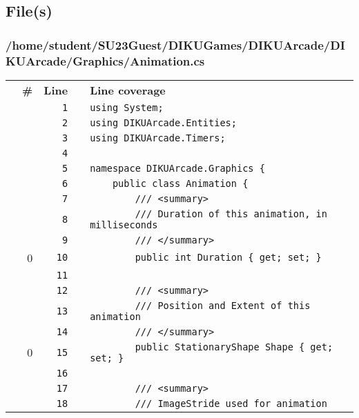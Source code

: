 \documentclass[a4paper,landscape,10pt]{article}
\begin{document}
\subsection{File(s)}
\subsubsection{/home/student/SU23Guest/DIKUGames/DIKUArcade/DIKUArcade/Graphics/Animation.cs}
\begin{longtable}[l]{lrrll}
\textbf{} & \textbf{\#} & \textbf{Line} & \textbf{} & \textbf{Line coverage}\\
\cellcolor{gray} &  & \verb~1~ & & \verb~using System;~\\
\cellcolor{gray} &  & \verb~2~ & & \verb~using DIKUArcade.Entities;~\\
\cellcolor{gray} &  & \verb~3~ & & \verb~using DIKUArcade.Timers;~\\
\cellcolor{gray} &  & \verb~4~ & & \verb~~\\
\cellcolor{gray} &  & \verb~5~ & & \verb~namespace DIKUArcade.Graphics {~\\
\cellcolor{gray} &  & \verb~6~ & & \verb~    public class Animation {~\\
\cellcolor{gray} &  & \verb~7~ & & \verb~        /// <summary>~\\
\cellcolor{gray} &  & \verb~8~ & & \verb~        /// Duration of this animation, in milliseconds~\\
\cellcolor{gray} &  & \verb~9~ & & \verb~        /// </summary>~\\
\cellcolor{red} & 0 & \verb~10~ & & \verb~        public int Duration { get; set; }~\\
\cellcolor{gray} &  & \verb~11~ & & \verb~~\\
\cellcolor{gray} &  & \verb~12~ & & \verb~        /// <summary>~\\
\cellcolor{gray} &  & \verb~13~ & & \verb~        /// Position and Extent of this animation~\\
\cellcolor{gray} &  & \verb~14~ & & \verb~        /// </summary>~\\
\cellcolor{red} & 0 & \verb~15~ & & \verb~        public StationaryShape Shape { get; set; }~\\
\cellcolor{gray} &  & \verb~16~ & & \verb~~\\
\cellcolor{gray} &  & \verb~17~ & & \verb~        /// <summary>~\\
\cellcolor{gray} &  & \verb~18~ & & \verb~        /// ImageStride used for animation~\\

\end{longtable}
\end{document}
